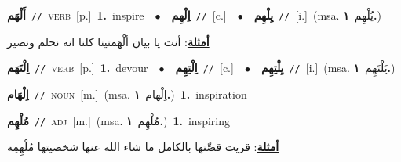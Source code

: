\documentclass[10pt,a4paper,twoside]{article} %
\begin{document}
\begin{multicols}{2}
{\setlength\topsep{0pt}\textbf{\foreignlanguage{arabic}{أَلْهَم}}\ {\color{gray}\texttt{//}\color{black}}\ \textsc{verb}\ [p.]\ \textbf{1.}~inspire\ \ $\bullet$\ \ \setlength\topsep{0pt}\textbf{\foreignlanguage{arabic}{اِلْهِم}}\ {\color{gray}\texttt{//}\color{black}}\ [c.]\ \ $\bullet$\ \ \setlength\topsep{0pt}\textbf{\foreignlanguage{arabic}{يِلْهِم}}\ {\color{gray}\texttt{//}\color{black}}\ [i.]\ \color{gray}(msa. \foreignlanguage{arabic}{يُلْهِم}~\foreignlanguage{arabic}{\textbf{١.}})\color{black}\  \begin{flushright}\color{gray}\foreignlanguage{arabic}{\textbf{\underline{\foreignlanguage{arabic}{أمثلة}}}: أنت يا بيان ألْهَمتينا كلنا انه نحلم ونصير}\end{flushright}\color{black}} \vspace{2mm}

{\setlength\topsep{0pt}\textbf{\foreignlanguage{arabic}{اِلْتَهَم}}\ {\color{gray}\texttt{//}\color{black}}\ \textsc{verb}\ [p.]\ \textbf{1.}~devour\ \ $\bullet$\ \ \setlength\topsep{0pt}\textbf{\foreignlanguage{arabic}{اِلْتِهِم}}\ {\color{gray}\texttt{//}\color{black}}\ [c.]\ \ $\bullet$\ \ \setlength\topsep{0pt}\textbf{\foreignlanguage{arabic}{يِلْتِهِم}}\ {\color{gray}\texttt{//}\color{black}}\ [i.]\ \color{gray}(msa. \foreignlanguage{arabic}{يَلْتَهِم}~\foreignlanguage{arabic}{\textbf{١.}})\color{black}\ } \vspace{2mm}

{\setlength\topsep{0pt}\textbf{\foreignlanguage{arabic}{اِلْهَام}}\ {\color{gray}\texttt{//}\color{black}}\ \textsc{noun}\ [m.]\ \color{gray}(msa. \foreignlanguage{arabic}{اِلْهام}~\foreignlanguage{arabic}{\textbf{١.}})\color{black}\ \textbf{1.}~inspiration\ } \vspace{2mm}

{\setlength\topsep{0pt}\textbf{\foreignlanguage{arabic}{مُلْهِم}}\ {\color{gray}\texttt{//}\color{black}}\ \textsc{adj}\ [m.]\ \color{gray}(msa. \foreignlanguage{arabic}{مُلْهِم}~\foreignlanguage{arabic}{\textbf{١.}})\color{black}\ \textbf{1.}~inspiring\  \begin{flushright}\color{gray}\foreignlanguage{arabic}{\textbf{\underline{\foreignlanguage{arabic}{أمثلة}}}: قريت قصِّتها بالكامل ما شاء الله عنها شخصيتها مُلْهِمِة}\end{flushright}\color{black}} \vspace{2mm}


\end{multicols}
\end{document}
